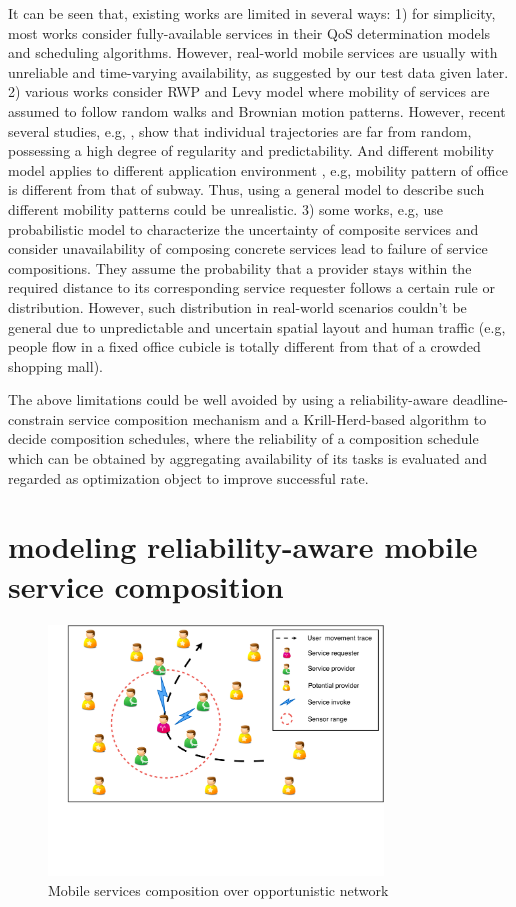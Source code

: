 \documentclass[journal]{IEEEtran}
\begin{document}
It can be seen that, existing works are limited in several ways: 
1) for simplicity, most works consider fully-available services in their QoS determination models and scheduling algorithms. However, real-world mobile services are usually with unreliable and time-varying availability, as suggested by our test data given later.
2) various works consider RWP and Levy model where mobility of services are assumed to follow random walks and Brownian motion patterns. However, recent several studies, e.g, \cite{barbosa2017human, bettstetter2003node, navidi2004improving}, show that individual trajectories are far from random, possessing a high degree of regularity and predictability. And different mobility model applies to different application environment \cite{camp2002survey}, e.g, mobility pattern of office is different from that of subway. Thus, using a general model to describe such different mobility patterns could be unrealistic.
3) some works, e.g, \cite{wang2011exploiting, Deng2016-2} use probabilistic model to characterize the uncertainty of composite services and consider unavailability of composing concrete services lead to failure of service compositions.
They assume the probability that a provider stays within the required distance to its corresponding service requester follows a certain rule or distribution. However, such distribution in real-world scenarios couldn't be general due to unpredictable and uncertain spatial layout and human traffic (e.g, people flow in a fixed office cubicle is totally different from that of a crowded shopping mall). 

The above limitations could be well avoided by using a reliability-aware deadline-constrain service composition mechanism and a Krill-Herd-based algorithm to decide composition schedules, where the reliability of a composition schedule which can be obtained by aggregating availability of its tasks is evaluated and regarded as optimization object to improve successful rate.

\section{modeling reliability-aware mobile service composition}
\begin{figure}[!t]
\centering
\includegraphics[width=3.5in]{./img/pic2.pdf}
\caption{Mobile services composition over opportunistic network}
\label{fig_MSCON}
\end{figure}
\end{document}
